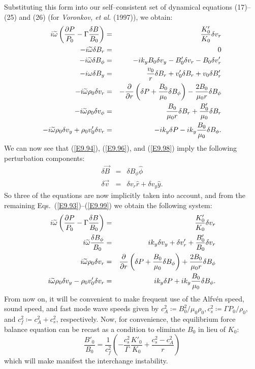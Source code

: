 \documentclass[a4paper,openany,12pt]{book}
\begin{document}
Substituting this form into our self--consistent set of dynamical equations (17)--(25) and (26) (for \emph{Voronkov, et al.} (1997)), we obtain:
\begin{eqnarray}
i\widetilde\omega\left({\partial P\over P_0}-\Gamma{\delta B\over B_0}\right)&=&{K'_0\over K_0}\delta v_r\label{E9.93}\\
-i\widetilde\omega\delta B_r&=&0\label{E9.94}\\
-i\widetilde\omega\delta B_\phi&=&-ik_y B_0\delta v_y-B'_0\delta v_r-B_0\delta v'_r
\label{E9.95}\\
-i\omega\delta B_y&=&{v_0\over r}\delta B_r+v'_0\delta B_r+v_0\delta B'_r\label{E9.96}\\
-i\widetilde\omega\rho_0\delta v_r&=&-{\partial\over\partial r}\left(\delta P+{B_0\over\mu_0}\delta B_\phi\right)-{2B_0\over\mu_0r}\delta B_\phi\label{E9.97}\\
-i\widetilde\omega\rho_0\delta v_\phi&=&{B_0\over\mu_0r}\delta B_r+{B'_0\over\mu_0}\delta B_r\label{E9.98}\\
-i\widetilde\omega\rho_0\delta v_y+\rho_0v'_0\delta v_r&=&-ik_y\delta P-ik_y{B_0\over\mu_0}\delta B_\phi.\label{E9.99}
\end{eqnarray}
We can now see that (\ref{E9.94}), (\ref{E9.96}), and (\ref{E9.98}) imply the following perturbation components:
\begin{eqnarray}
\delta\vec B&=&\delta B_\phi\widehat\phi\label{E9.100}\\
\delta\vec v&=&\delta v_r\widehat r+\delta v_y\widehat y.\label{E9.101}
\end{eqnarray}
So three of the equations are now implicitly taken into account, and from the remaining 
Eqs.~(\ref{E9.93})--(\ref{E9.99}) we obtain the following system:
\begin{eqnarray} 
i\widetilde\omega\left({\partial P\over P_0}-\Gamma{\delta B\over B_0}\right)&=&{K'_0\over K_0}\delta v_r\label{E9.102}\\
i\widetilde\omega{\delta B_\phi\over B_0}&=&ik_y\delta v_y+\delta v'_r+{B'_0\over B_0}
\delta v_r\label{E9.103}\\
i\widetilde\omega\rho_0\delta v_r&=&{\partial\over\partial r}\left(\delta P+{B_0\over\mu_0}\delta B_\phi\right)+{2B_0\over\mu_0r}\delta B_\phi\label{E9.104}\\
i\widetilde\omega\rho_0\delta v_y-\rho_0v'_0\delta v_r&=&ik_y\delta P+ik_y{B_0\over\mu_0}\delta B_\phi.\label{E9.105}
\end{eqnarray}
From now on, it will be convenient to make frequent use of the Alfv\'en speed, sound speed, and fast mode wave speeds given by $c_A^2\coloneqq B_0^2/\mu_0\rho_0, c_s^2\coloneqq\Gamma P_0/\rho_0$, and $c_f^2\coloneqq c_A^2+c_s^2$, respectively. Now, for convenience, the equilibrium force balance equation can be recast as a condition to eliminate $B_0$ in lieu of $K_0$:
\begin{equation}
\frac{B'_0}{B_0}=\frac{1}{c_f^2}\left(-\frac{c_s^2}{\Gamma}\frac{K'_0}{K_0}+\frac{c_s^2-c_A^2}{r}\right)\label{E9.106}
\end{equation}
which will make manifest the interchange instability.
\end{document}
